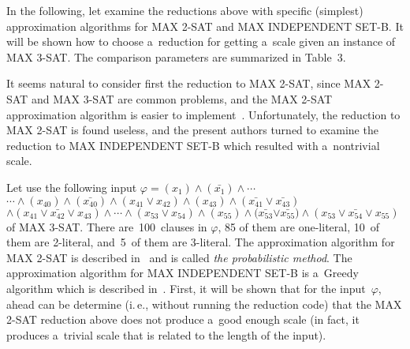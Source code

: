 \begin{multicols}{2}
In the following,  let examine the reductions above with specific
(simplest) approximation algorithms for {MAX 2-SAT} and {MAX
INDEPENDENT SET-B}. It will be shown how to choose a~reduction for getting a~scale given an instance of {MAX 3-SAT}. The comparison
parameters are summarized in Table~3. %




It seems natural to consider first the reduction to {MAX 2-SAT},
since {MAX 2-SAT} and {MAX 3-SAT} are common problems, and
the {MAX 2-SAT} approximation algorithm is easier to
implement~\cite{link-to-the-sofware-cite}. Unfortunately, the reduction to
{MAX 2-SAT} is found useless, and the present authors turned to examine the
reduction to {MAX INDEPENDENT SET-B} which resulted with a~nontrivial scale.

Let use the following input $\varphi = (x_1)\wedge (\bar{x_1})\wedge
\cdots $\linebreak $\cdots\wedge(x_{40})\wedge (\bar{x_{40}})\wedge(x_{41}\vee
x_{42})\wedge(x_{43})\wedge(\bar{x_{41}}\vee
\bar{x_{43}})$\linebreak $\wedge(x_{41}\vee \bar{x_{42}} \vee x_{43})\wedge \cdots
\wedge (x_{53}\vee x_{54})\wedge(x_{55})\wedge(\bar{x_{53}}$\linebreak $\vee
\bar{x_{55}})\wedge(x_{53}\vee \bar{x_{54}} \vee x_{55})$ of {MAX 3-SAT}.
There are~100~clauses in $\varphi$, 85 of them are
one-literal, 10~of them are 2-literal, and~5~of them are 3-literal.
The approximation algorithm for MAX 2-SAT is described
in~\cite{Y1994} and is called \textit{the probabilistic method}. The
approximation algorithm for {MAX INDEPENDENT SET-B} is a~Greedy
algorithm which is described in~\cite{HR1994}. First,  it will be shown that
for the input~$\varphi$, ahead can be determine (i.\,e., without
running the reduction code) that the {MAX 2-SAT} reduction above
does not produce a~good enough scale (in fact, it produces a~trivial
scale that is related to the length of the input).


\end{multicols}
